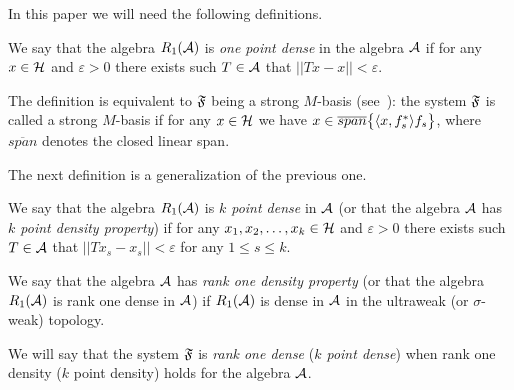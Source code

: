 \documentclass[12pt,oneside,a4paper]{amsart}
\begin{document}
  In this paper we will need the following definitions.
  \begin{definition}
    \label{1pd}
    We say that the algebra $R_1(\cal{A})$ is \emph{one point dense} in the algebra $\cal{A}$ if for any $x \in \cal{H}$ and $\varepsilon > 0$
      there exists such $T\in \cal{A}$ that $||Tx - x|| < \varepsilon$.
  \end{definition}

    The definition is equivalent to $\fsys$ being a strong $M$-basis (see~\cite{katavolos}):
    the system $\fsys$ is called a strong $M$-basis if for any $x\in\cal{H}$ we have $x \in \overline{span}\big\{\inner{x}{f^*_s}f_s\big\}$, where $\overline{span}$ denotes the closed linear span.

  The next definition is a generalization of the previous one.
  \begin{definition}
    \label{kpd}
    We say that the algebra $R_1(\cal{A})$ is \emph{$k$ point dense} in $\cal{A}$ (or that the algebra $\cal{A}$ has
      \emph{$k$ point density property}) if for any $x_1, x_2, \dots, x_k \in \cal{H}$ and $\varepsilon > 0$
      there exists such $T\in \cal{A}$ that $||Tx_s - x_s|| < \varepsilon$ for any $1 \leq s \leq k$.
  \end{definition}

  \begin{definition}
    \label{r1d}
    We say that the algebra $\cal{A}$ has \emph{rank one density property} (or that the algebra $R_1(\cal{A})$
      is rank one dense in $\cal{A}$) if
      $R_1(\cal{A})$ is dense in $\cal{A}$ in the ultraweak (or $\sigma$-weak) topology.
  \end{definition}
  We will say that the system $\fsys$ is \emph{rank one dense} (\emph{$k$ point dense})
    when rank one density ($k$ point density) holds for the algebra $\cal{A}$.

\end{document}
